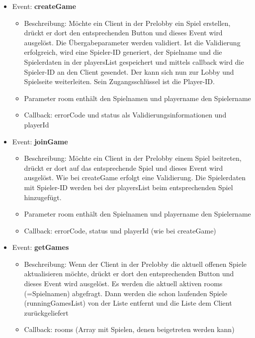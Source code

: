 \documentclass[conference]{IEEEtran}
\begin{document}
\begin{itemize}

\item Event: \textbf{createGame}
\begin{itemize}
\item Beschreibung: Möchte ein Client in der Prelobby ein Spiel erstellen, drückt er dort den entsprechenden Button und dieses Event wird ausgelöst. Die Übergabeparameter werden validiert. Ist die Validierung erfolgreich, wird eine Spieler-ID generiert, der Spielname und die Spielerdaten in der playersList gespeichert und mittels callback wird die Spieler-ID an den Client gesendet. Der kann sich nun zur Lobby und Spielseite weiterleiten. Sein Zugangsschlüssel ist die Player-ID.
\item Parameter \glqq room\grqq{} enthält den Spielnamen und \glqq playername\grqq{} den Spielername
\item Callback: \glqq errorCode\grqq{} und \glqq status\grqq{} als Validierungsinformationen und \glqq playerId\grqq{}
\end{itemize}

\item Event: \textbf{joinGame}
\begin{itemize}
\item Beschreibung: Möchte ein Client in der Prelobby einem Spiel beitreten, drückt er dort auf das entsprechende Spiel und dieses Event wird ausgelöst. Wie bei createGame erfolgt eine Validierung. Die Spielerdaten mit Spieler-ID werden bei der playersList beim entsprechenden Spiel hinzugefügt.
\item Parameter \glqq room\grqq{} enthält den Spielnamen und \glqq playername\grqq{} den Spielername
\item Callback: \glqq errorCode\grqq{}, \glqq status\grqq{} und \glqq playerId\grqq{} (wie bei createGame)
\end{itemize}

\item Event: \textbf{getGames}
\begin{itemize}
\item Beschreibung: Wenn der Client in der Prelobby die aktuell offenen Spiele aktualisieren möchte, drückt er dort den entsprechenden Button und dieses Event wird ausgelöst. Es werden die aktuell aktiven rooms (=Spielnamen) abgefragt. Dann werden die schon laufenden Spiele (runningGamesList) von der Liste entfernt und die Liste dem Client zurückgeliefert
\item Callback: \glqq rooms\grqq{} (Array mit Spielen, denen beigetreten werden kann)
\end{itemize}


\end{itemize}
\end{document}
